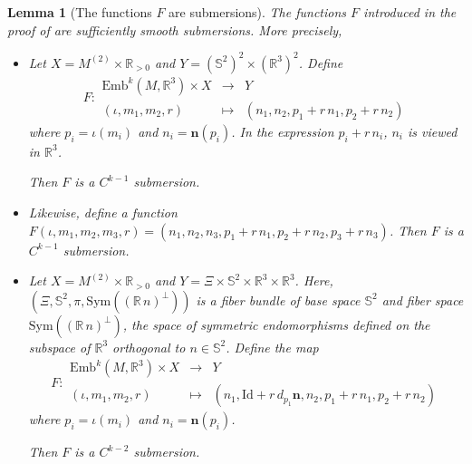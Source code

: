 \documentclass[11pt]{article}
\newcommand{\R}{\mathbb{R}}
\newcommand{\io}{\iota}
\newcommand{\nbf}{\mathbf{n}}
\newcommand{\Emb}{\mathrm{Emb}^k(M,\R^3)}
\newcommand{\Id}{\mathrm{Id}}
\theoremstyle{plain}
\newtheorem{lem}{Lemma}
\theoremstyle{definition}
\theoremstyle{remark}
\begin{document}
\begin{lem}[The functions $F$ are submersions]
	\label{lem:submersion}
The functions $F$ introduced in the proof of  are sufficiently smooth submersions. More precisely,
\begin{itemize}
\item
Let $X = M^{(2)} \times \R_{>0}$ and $Y = (\mathbb{S}^2)^2 \times (\R^3)^2$. Define 
\begin{equation}
	F:
	\begin{array}{ccc}
		\Emb \times X & \to & Y \\
		(\io, m_1,m_2,r) & \mapsto & (n_1, n_2, p_1 + r \, n_1, p_2 + r \, n_2 )
	\end{array}
\end{equation}
where $p_i = \io(m_i)$ and $n_i = \nbf(p_i)$. In the expression $p_i + r \, n_i$, $n_i$ is viewed in $\R^3$.

Then $F$ is a $C^{k-1}$ submersion.

\item Likewise, define a function $F(\io, m_1,m_2,m_3,r) = (n_1, n_2, n_3, p_1 + r \, n_1, p_2 + r \, n_2 , p_3 + r \, n_3)$.
Then $F$ is a $C^{k-1}$ submersion.

\item Let $X = M^{(2)} \times \R_{>0}$ and $Y = \Xi \times \mathbb{S}^2 \times \R^3 \times \R^3$. Here, $(\Xi, \mathbb{S}^2, \pi, \mathrm{Sym}((\R \, n)^\perp))$ is a fiber bundle of base space $\mathbb{S}^2$ and fiber space $\mathrm{Sym}((\R \, n)^\perp)$, the space of symmetric endomorphisms defined on the subspace of $\R^3$ orthogonal to $n \in \mathbb{S}^2$.
Define the map
\begin{equation}
	F:
	\begin{array}{ccc}
		\Emb \times X & \to & Y \\
		(\io, m_1,m_2,r) & \mapsto & (n_1, \Id + r \, d_{p_1}\nbf, n_2, p_1 + r \, n_1, p_2 + r \, n_2 )
	\end{array}
\end{equation}
where $p_i = \io(m_i)$ and $n_i = \nbf(p_i)$.

Then $F$ is a $C^{k-2}$ submersion.
\end{itemize}
\end{lem}
\end{document}
